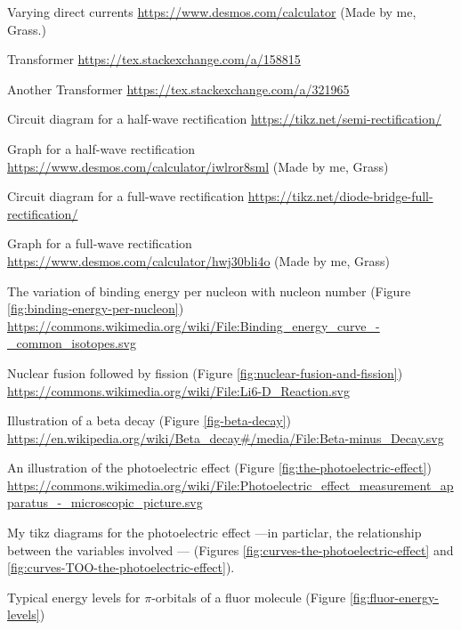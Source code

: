 \documentclass[oneside]{book}
\begin{document}
\begin{enumerate}[label={[\arabic*]}]
    \item\label{Varying direct current} Varying direct currents \url{https://www.desmos.com/calculator} (Made by me, Grass.)
    \item\label{Transformer} Transformer \url{https://tex.stackexchange.com/a/158815}
    \item\label{Another Transformer} Another Transformer \url{https://tex.stackexchange.com/a/321965}
    \item\label{Half-Wave-Recification-Circuit} Circuit diagram for a half-wave rectification \url{https://tikz.net/semi-rectification/}
    \item\label{Half-Wave-Recification-Graph} Graph for a half-wave rectification \url{https://www.desmos.com/calculator/iwlror8sml} (Made by me, Grass)
    \item\label{Full-Wave-Rectificaion-Circuit} Circuit diagram for a full-wave rectification \url{https://tikz.net/diode-bridge-full-rectification/}
    \item\label{Full-Wave-Rectification-Graph} Graph for a full-wave rectification \url{https://www.desmos.com/calculator/hwj30bli4o} (Made by me, Grass)
    \item\label{source:binding-energy-per-nucleon} The variation of binding energy per nucleon with nucleon number (Figure \ref{fig:binding-energy-per-nucleon}) \url{https://commons.wikimedia.org/wiki/File:Binding_energy_curve_-_common_isotopes.svg}
    \item\label{source:nuclear-fusion-and-fission} 
    Nuclear fusion followed by fission
    (Figure \ref{fig:nuclear-fusion-and-fission}) \url{https://commons.wikimedia.org/wiki/File:Li6-D_Reaction.svg} 
    \item\label{source:beta-decay} Illustration of a beta decay (Figure \ref{fig-beta-decay}) \url{https://en.wikipedia.org/wiki/Beta_decay#/media/File:Beta-minus_Decay.svg}
    \item\label{source:the-photoelectric-effect} An illustration of the photoelectric effect (Figure \ref{fig:the-photoelectric-effect}) \url{https://commons.wikimedia.org/wiki/File:Photoelectric_effect_measurement_apparatus_-_microscopic_picture.svg}
    \item\label{source:curves-the-photoelectric-effect} My tikz diagrams for the photoelectric effect ---in particlar, the relationship between the variables involved --- (Figures \ref{fig:curves-the-photoelectric-effect} and \ref{fig:curves-TOO-the-photoelectric-effect}).
    \item\label{source:fluor-energy-levels} Typical energy levels for \(\pi\)-orbitals of a fluor molecule (Figure \ref{fig:fluor-energy-levels}) 
    

\end{enumerate}
\end{document}
